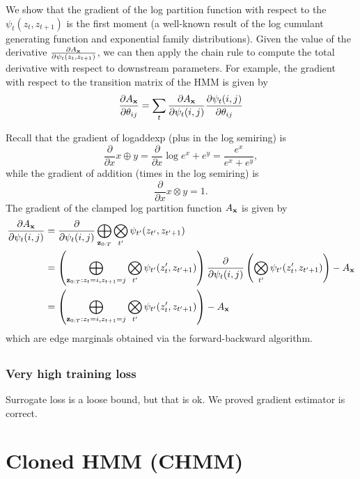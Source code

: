 \documentclass[12pt]{article}
\begin{document}
We show that the gradient of the log partition function with respect to the $\psi_t(z_t, z_{t+1})$
is the first moment (a well-known result of the log cumulant generating function
and exponential family distributions). Given the value of the derivative
$\frac{\partial A_{\mathbf{x}}}{\partial \psi_t(z_t, z_{t+1})}$,
we can then apply the chain rule to compute the total derivative with respect to
downstream parameters. For example, the gradient with respect to the transition matrix
of the HMM is given by
$$\frac{\partial A_{\mathbf{x}}}{\partial \theta_{ij}}
= \sum_t \frac{\partial A_{\mathbf{x}}}{\partial \psi_t(i,j)}
\frac{\partial \psi_t(i,j)}{\partial \theta_{ij}}$$

Recall that the gradient of logaddexp (plus in the log semiring) is
$$\frac{\partial}{\partial x} x \oplus y
= \frac{\partial}{\partial x} \log e^x + e^ y = \frac{e^x}{e^x + e^y},$$
while the gradient of addition (times in the log semiring) is
$$\frac{\partial}{\partial x} x \otimes y = 1.$$
The gradient of the clamped log partition function $A_{\mathbf{x}}$ is given by
\begin{align*}
\frac{\partial A_{\mathbf{x}}}{\partial \psi_t(i,j)}
&= \frac{\partial}{\partial \psi_t(i,j)} \bigoplus_{\mathbf{z}_{0:T}}
    \bigotimes_{t'} \psi_{t'}(z_{t'}, z_{t'+1})\\
&= \left(\bigoplus_{\mathbf{z}_{0:T}:z_t = i, z_{t+1} = j} 
    \bigotimes_{t'} \psi_{t'}(z_{t}', z_{t'+1})\right)
    \frac{\partial}{\partial \psi_t(i,j)}\left(\bigotimes_{t'} \psi_{t'}(z_{t}', z_{t'+1})\right) - A_{\mathbf{x}}\\
&= \left(\bigoplus_{\mathbf{z}_{0:T}:z_t = i, z_{t+1} = j} 
    \bigotimes_{t'} \psi_{t'}(z_{t}', z_{t'+1})\right)
    - A_{\mathbf{x}}
\end{align*} 
which are edge marginals obtained via the forward-backward algorithm.

\subsection{}


\subsubsection{Very high training loss}
Surrogate loss is a loose bound, but that is ok.
We proved gradient estimator is correct.

\section{Cloned HMM (CHMM)}




%
%
\end{document}
